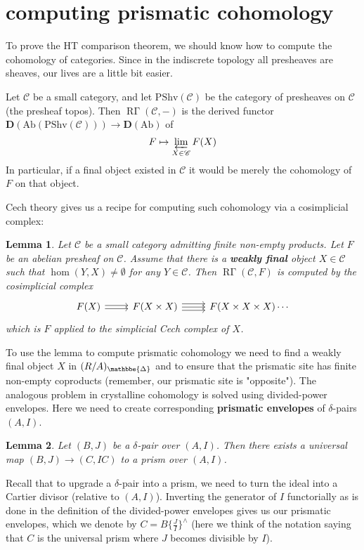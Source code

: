 \documentclass[12pt]{amsproc}
\newtheorem{lemma}{Lemma}
\theoremstyle{definition}
\newcommand{\sma}{\wedge}
\newcommand{\ra}{\rightarrow}
\DeclareMathOperator{\Hom}{hom}
\DeclareMathOperator{\invlim}{\varprojlim}
\DeclareMathOperator{\prism}{\mathbbe{\Delta}}
\DeclareMathOperator{\RGamma}{R\Gamma}
\newcommand{\C}{\mathscr{C}}
\begin{document}
\section{computing prismatic cohomology}
To prove the HT comparison theorem, we should know how to compute the cohomology of categories. Since in the indiscrete topology all presheaves are sheaves, our lives are a little bit easier.

Let $\C$ be a small category, and let $\text{PShv}(\C)$ be the category of presheaves on $\C$ (the presheaf topos). Then $\RGamma(\C,-)$ is the derived functor $\mathbf{D}(\text{Ab}(\text{PShv}(\C)))\ra \mathbf{D}(\text{Ab})$ of
\[	F\mapsto \invlim_{X\in\C} F(X)	\]
In particular, if a final object existed in $\C$ it would be merely the cohomology of $F$ on that object.

Cech theory gives us a recipe for computing such cohomology via a cosimplicial complex:

\begin{lemma} Let $\C$ be a small category admitting finite non-empty products. Let $F$ be an abelian presheaf on $\C$. Assume that there is a \textbf{weakly final} object $X\in\C$ such that $\Hom(Y,X)\neq \emptyset$ for any $Y\in\C$. Then $\RGamma(\C,F)$ is computed by the cosimplicial complex
\[\begin{tikzcd} F(X)\arrow[r, shift right=.7]\arrow[r, shift left=.7]& F(X\times X)
	\arrow[r, shift right=1.4]\arrow[r]\arrow[r,shift left=1.4]&F(X\times X\times X)\cdots
\end{tikzcd}\]
which is $F$ applied to the simplicial Cech complex of $X$.
\end{lemma}

To use the lemma to compute prismatic cohomology we need to find a weakly final object $X$ in $(R/A)_{\prism}$ and to ensure that the prismatic site has finite non-empty coproducts (remember, our prismatic site is "opposite"). The analogous problem in crystalline cohomology is solved using divided-power envelopes. Here we need to create corresponding \textbf{prismatic envelopes} of $\delta$-pairs $(A,I)$.

\begin{lemma} Let $(B,J)$ be a $\delta$-pair over $(A,I)$. Then there exists a universal map $(B,J)\ra (C,IC)$ to a prism over $(A,I)$.
\end{lemma}

Recall that to upgrade a $\delta$-pair into a prism, we need to turn the ideal into a Cartier divisor (relative to $(A,I)$). Inverting the generator of $I$ functorially as is done in the definition of the divided-power envelopes gives us our prismatic envelopes, which we denote by $C=B\{\frac{J}{I}\}^{\sma}$ (here we think of the notation saying that $C$ is the universal prism where $J$ becomes divisible by $I$).
\end{document}
